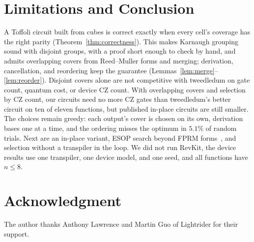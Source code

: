 \documentclass[conference]{IEEEtran}
\theoremstyle{plain}
\begin{document}
\section{Limitations and Conclusion}
A Toffoli circuit built from cubes is correct exactly when every cell's
coverage has the right parity (Theorem~\ref{thm:correctness}). This
makes Karnaugh grouping sound with disjoint groups, with a proof short
enough to check by hand, and admits overlapping covers from Reed--Muller
forms and merging; derivation, cancellation, and reordering keep the
guarantee (Lemmas~\ref{lem:merge}--\ref{lem:reorder}). Disjoint covers
alone are not competitive with tweedledum on gate count, quantum cost,
or device CZ count. With overlapping covers and selection by CZ count,
our circuits need no more CZ gates than tweedledum's better circuit on
ten of eleven functions, but published in-place circuits are still
smaller. The choices remain greedy: each output's cover is chosen on its
own, derivation bases one at a time, and the ordering misses the
optimum in $5.1\%$ of random trials. Next are an in-place variant,
ESOP search beyond FPRM forms~\cite{mishchenko2001}, and selection
without a transpiler in the loop. We did not run RevKit, the device
results use one transpiler, one device model, and one seed, and all
functions have $n\le8$.


\section*{Acknowledgment}
The author thanks Anthony Lawrence and Martin Guo of Lightrider for their support.
\end{document}
